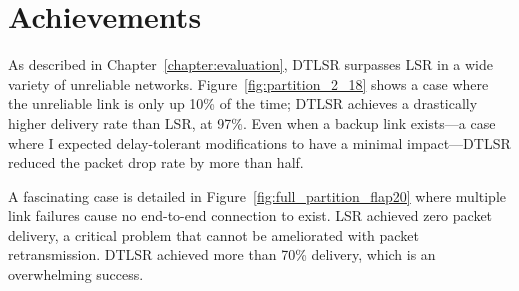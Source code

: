\documentclass[withindex,glossary,openany]{cam-thesis}
\begin{document}
\section{Achievements}

As described in Chapter~\ref{chapter:evaluation}, DTLSR surpasses LSR in a wide variety of unreliable networks. Figure~\ref{fig:partition_2_18} shows a case where the unreliable link is only up 10\% of the time; DTLSR achieves a drastically higher delivery rate than LSR, at 97\%. Even when a backup link exists---a case where I expected delay-tolerant modifications to have a minimal impact---DTLSR reduced the packet drop rate by more than half.

A fascinating case is detailed in Figure~\ref{fig:full_partition_flap20} where multiple link failures cause no end-to-end connection to exist. LSR achieved zero packet delivery, a critical problem that cannot be ameliorated with packet retransmission. DTLSR achieved more than 70\% delivery, which is an overwhelming success.
\end{document}
